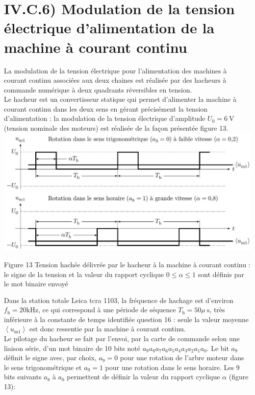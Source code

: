 \documentclass[10pt]{article}
\begin{document}
\section*{IV.C.6) Modulation de la tension électrique d'alimentation de la machine à courant continu}
La modulation de la tension électrique pour l'alimentation des machines à courant continu associées aux deux chaines est réalisée par des hacheurs à commande numérique à deux quadrants réversibles en tension.\\
Le hacheur est un convertisseur statique qui permet d'alimenter la machine à courant continu dans les deux sens en gérant précisément la tension d'alimentation : la modulation de la tension électrique d'amplitude $U_{0}=6 \mathrm{~V}$ (tension nominale des moteurs) est réalisée de la façon présentée figure 13.\\
\includegraphics[max width=\textwidth, center]{2024_12_07_51b7f57c7f055c2d8d29g-09}

Figure 13 Tension hachée délivrée par le hacheur à la machine à courant continu : le signe de la tension et la valeur du rapport cyclique $0 \leqslant \alpha \leqslant 1$ sont définis par le mot binaire envoyé

Dans la station totale Leica tcra 1103, la fréquence de hachage est d'environ $f_{\mathrm{h}}=20 \mathrm{kHz}$, ce qui correspond à une période de séquence $T_{\mathrm{h}}=50 \mu \mathrm{~s}$, très inférieure à la constante de temps identifiée question 16 : seule la valeur moyenne $\left\langle u_{\mathrm{m} 1}\right\rangle$ est donc ressentie par la machine à courant continu.\\
Le pilotage du hacheur se fait par l'envoi, par la carte de commande selon une liaison série, d'un mot binaire de 10 bits noté $a_{9} a_{8} a_{7} a_{6} a_{5} a_{4} a_{3} a_{2} a_{1} a_{0}$. Le bit $a_{9}$ définit le signe avec, par choix, $a_{9}=0$ pour une rotation de l'arbre moteur dans le sens trigonométrique et $a_{9}=1$ pour une rotation dans le sens horaire. Les 9 bits suivants $a_{8}$ à $a_{0}$ permettent de définir la valeur du rapport cyclique $\alpha$ (figure 13):
\end{document}
